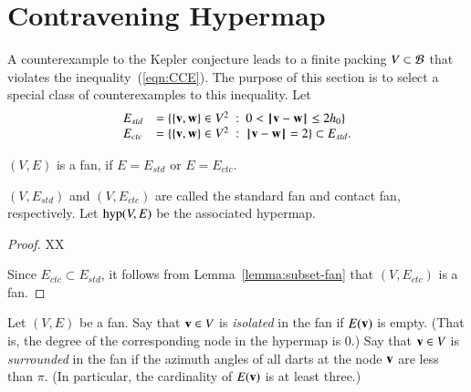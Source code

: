 \section{Contravening Hypermap}

%
A counterexample to the Kepler conjecture leads to a finite packing $V\subset {\mathcal B}$ that violates the inequality~(\ref{eqn:CCE}).
 The purpose of this section is to select a special class of counterexamples to this inequality.
Let
\begin{equation}\label{eqn:fan-edge}
\begin{array}{lll}
 E_{std} &= \{\{{\mathbf v},{\mathbf w}\}\in V^2\ :\  0 < {\hskip0.1em|\hskip-0.15em|\hskip0.1em}{\mathbf v} - {\mathbf w}{\hskip0.1em|\hskip-0.15em|\hskip0.1em}\le 2{h_0} \}\\
 E_{ctc} &= \{\{{\mathbf v},{\mathbf w}\}\in V^2\ :\  {\hskip0.1em|\hskip-0.15em|\hskip0.1em}{\mathbf v} - {\mathbf w}{\hskip0.1em|\hskip-0.15em|\hskip0.1em}= 2 \}\subset E_{std}.
\end{array}
\end{equation}

\begin{lemma}
$(V,E)$ is a fan, if $E=E_{std}$ or $E=E_{ctc}$.
\end{lemma}
$(V,E_{std})$ and $(V,E_{ctc})$ are called the standard fan and contact fan, respectively.
Let ${\operatorname{hyp}}(V,E)$ be the associated hypermap.
%
%
%
%
%
%
%

\begin{proof} 
XX

Since $E_{ctc}\subset E_{std}$, it follows from Lemma~\ref{lemma:subset-fan} that
$(V,E_{ctc})$ is a fan.
\end{proof}

\begin{definition}
Let $(V,E)$ be a fan.
Say that ${\mathbf v}\in V$ is {\it isolated} in the fan if $E({\mathbf v})$ is empty.
(That is, the degree of the corresponding node in the hypermap is $0$.) Say that ${\mathbf v}\in V$ is {\it surrounded} in the fan if the azimuth angles of all darts at the node ${\mathbf v}$ are less than $\pi$.  (In particular, the cardinality of $E({\mathbf v})$ is at least three.)
\end{definition}
%
%
%
%
%
%

